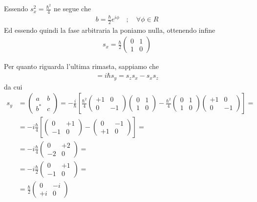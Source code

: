 Essendo $s_x^2= \frac{\hbar^2}{4}$ ne segue che 
\begin{align}
b= \frac{\hbar}{2} e^{i\phi} \quad ; \quad \forall \phi \in R
\end{align}
Ed essendo quindi la fase arbitraria la poniamo nulla, ottenendo infine
\begin{align}
s_x = \frac{\hbar}{2}\left(
\begin{array}{ccc}
0 & 1 \\
1 & 0
\end{array}
\right)
\end{align}

Per quanto riguarda l'ultima rimasta, sappiamo che
\begin{align}
[s_z,s_x]=i\hbar s_y=s_zs_x-s_xs_z
\end{align}
da cui
\begin{align}
s_y{}&=\left(
\begin{array}{ccc}
a & b \\
b^* & c
\end{array}
\right) = -\frac{i}{\hbar} \left[
\frac{\hbar^2}{4}
\left(
\begin{array}{ccc}
+1 & 0 \\
0 & -1
\end{array}
\right)
\left(
\begin{array}{ccc}
0 & 1 \\
1 & 0
\end{array}
\right)
-\frac{\hbar^2}{4}
\left(
\begin{array}{ccc}
0 & 1 \\
1 & 0
\end{array}
\right)
\left(
\begin{array}{ccc}
+1 & 0 \\
0 & -1
\end{array}
\right)
\right]= \nonumber \\
&=-i\frac{\hbar}{4} \left[
\left(
\begin{array}{ccc}
0 & +1 \\
-1 & 0
\end{array}
\right)
- 
\left(
\begin{array}{ccc}
0 & -1 \\
+1 & 0
\end{array}
\right)
\right] = \nonumber \\
&= -i\frac{\hbar}{4}
\left(
\begin{array}{ccc}
0 & +2 \\
-2 & 0
\end{array}
\right) = \nonumber \\
&= -i\frac{\hbar}{2}
\left(
\begin{array}{ccc}
0 & +1 \\
-1 & 0
\end{array}
\right)= \nonumber \\
&= \frac{\hbar}{2}
\left(
\begin{array}{ccc}
0 & -i \\
+i & 0
\end{array}
\right)
\end{align}


